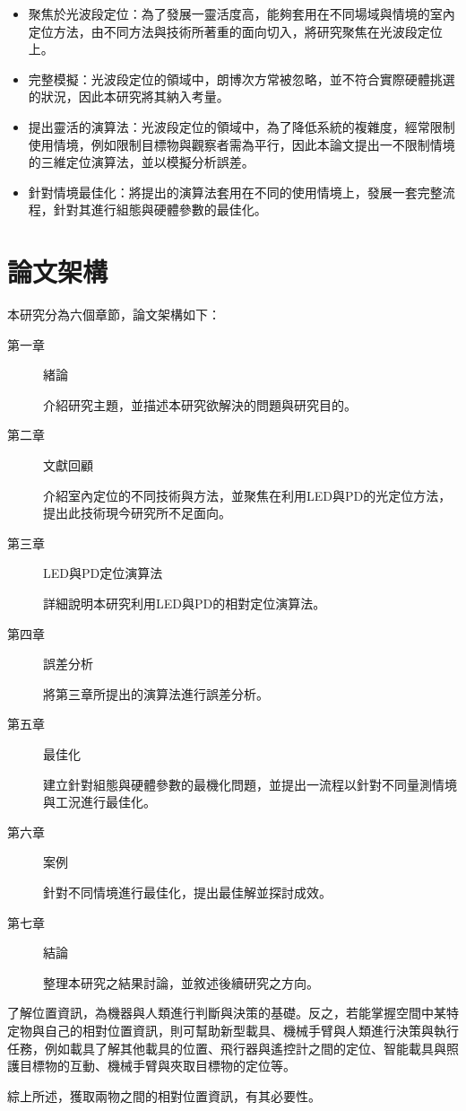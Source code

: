 


\begin{itemize} 
    \item{聚焦於光波段定位}：為了發展一靈活度高，能夠套用在不同場域與情境的室內定位方法，由不同方法與技術所著重的面向切入，將研究聚焦在光波段定位上。
    \item{完整模擬}：光波段定位的領域中，朗博次方常被忽略，並不符合實際硬體挑選的狀況，因此本研究將其納入考量。
    \item{提出靈活的演算法}：光波段定位的領域中，為了降低系統的複雜度，經常限制使用情境，例如限制目標物與觀察者需為平行，因此本論文提出一不限制情境的三維定位演算法，並以模擬分析誤差。
    \item{針對情境最佳化}：將提出的演算法套用在不同的使用情境上，發展一套完整流程，針對其進行組態與硬體參數的最佳化。
\end{itemize}









\section{論文架構}
本研究分為六個章節，論文架構如下：

\begin{description}
    \item[第一章] 緒論
    
    介紹研究主題，並描述本研究欲解決的問題與研究目的。
    
    \item[第二章] 文獻回顧
    
    介紹室內定位的不同技術與方法，並聚焦在利用LED與PD的光定位方法，提出此技術現今研究所不足面向。
    
    \item[第三章] LED與PD定位演算法
    
    詳細說明本研究利用LED與PD的相對定位演算法。

    \item[第四章] 誤差分析
    
    將第三章所提出的演算法進行誤差分析。
    
    \item[第五章] 最佳化
    
    建立針對組態與硬體參數的最機化問題，並提出一流程以針對不同量測情境與工況進行最佳化。
    
    \item[第六章] 案例
    
    針對不同情境進行最佳化，提出最佳解並探討成效。
    
    \item[第七章] 結論
    
    整理本研究之結果討論，並敘述後續研究之方向。
    
    \end{description}







    了解位置資訊，為機器與人類進行判斷與決策的基礎。反之，若能掌握空間中某特定物與自己的相對位置資訊，則可幫助新型載具、機械手臂與人類進行決策與執行任務，例如載具了解其他載具的位置、飛行器與遙控計之間的定位、智能載具與照護目標物的互動、機械手臂與夾取目標物的定位等。


    綜上所述，獲取兩物之間的相對位置資訊，有其必要性。